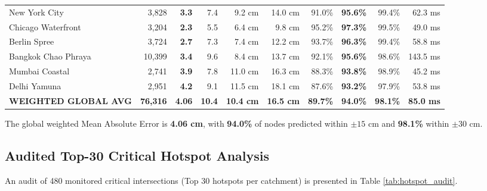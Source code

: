 \documentclass[conference]{IEEEtran}
\begin{document}
\begin{table}[t]
\begin{tabular}{lrrrrrrrrr}
New York City & 3,828 & \textbf{3.3} & 7.4 & 9.2 cm & 14.0 cm & 91.0\% & \textbf{95.6\%} & 99.4\% & 62.3 ms \\
Chicago Waterfront & 3,204 & \textbf{2.3} & 5.5 & 6.4 cm & 9.8 cm & 95.2\% & \textbf{97.3\%} & 99.5\% & 49.0 ms \\
Berlin Spree & 3,724 & \textbf{2.7} & 7.3 & 7.4 cm & 12.2 cm & 93.7\% & \textbf{96.3\%} & 99.4\% & 58.8 ms \\
Bangkok Chao Phraya & 10,399 & \textbf{3.4} & 9.6 & 8.4 cm & 13.7 cm & 92.1\% & \textbf{95.6\%} & 98.6\% & 143.5 ms \\
Mumbai Coastal & 2,741 & \textbf{3.9} & 7.8 & 11.0 cm & 16.3 cm & 88.3\% & \textbf{93.8\%} & 98.9\% & 45.2 ms \\
Delhi Yamuna & 2,951 & \textbf{4.2} & 9.1 & 11.5 cm & 18.1 cm & 87.6\% & \textbf{93.2\%} & 97.9\% & 53.8 ms \\
\midrule
\textbf{WEIGHTED GLOBAL AVG} & \textbf{76,316} & \textbf{4.06} & \textbf{10.4} & \textbf{10.4 cm} & \textbf{16.5 cm} & \textbf{89.7\%} & \textbf{94.0\%} & \textbf{98.1\%} & \textbf{85.0 ms} \\
\bottomrule
\end{tabular}
\end{table}

The global weighted Mean Absolute Error is \textbf{4.06 cm}, with \textbf{94.0\%} of nodes predicted within $\pm 15\text{ cm}$ and \textbf{98.1\%} within $\pm 30\text{ cm}$.

\subsection{Audited Top-30 Critical Hotspot Analysis}
An audit of 480 monitored critical intersections (Top 30 hotspots per catchment) is presented in Table \ref{tab:hotspot_audit}.
\end{document}
